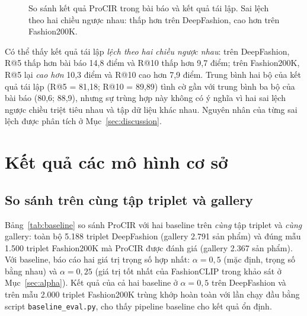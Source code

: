 \begin{figure}[h]
\centering
{}
\caption{So sánh kết quả ProCIR trong bài báo và kết quả tái lập. Sai lệch theo hai chiều ngược nhau: thấp hơn trên DeepFashion, cao hơn trên Fashion200K.}
\label{fig:repro-bar}
\end{figure}

Có thể thấy kết quả tái lập \emph{lệch theo hai chiều ngược nhau}: trên DeepFashion, R@5 thấp hơn bài báo 14,8 điểm và R@10 thấp hơn 9,7 điểm; trên Fashion200K, R@5 lại \emph{cao hơn} 10,3 điểm và R@10 cao hơn 7,9 điểm. Trung bình hai bộ của kết quả tái lập (R@5 = 81,18; R@10 = 89,89) tình cờ gần với trung bình ba bộ của bài báo (80,6; 88,9), nhưng sự trùng hợp này không có ý nghĩa vì hai sai lệch ngược chiều triệt tiêu nhau và tập dữ liệu khác nhau. Nguyên nhân của từng sai lệch được phân tích ở Mục~\ref{sec:discussion}.

\section{Kết quả các mô hình cơ sở}\label{sec:baseline-results}

\subsection{So sánh trên cùng tập triplet và gallery}

Bảng~\ref{tab:baseline} so sánh ProCIR với hai baseline trên \emph{cùng} tập triplet và \emph{cùng} gallery: toàn bộ 5.188 triplet DeepFashion (gallery 2.791 sản phẩm) và đúng mẫu 1.500 triplet Fashion200K mà ProCIR được đánh giá (gallery 2.367 sản phẩm). Với baseline, báo cáo hai giá trị trọng số hợp nhất: $\alpha = 0{,}5$ (mặc định, trọng số bằng nhau) và $\alpha = 0{,}25$ (giá trị tốt nhất của FashionCLIP trong khảo sát ở Mục~\ref{sec:alpha}). Kết quả của cả hai baseline ở $\alpha = 0{,}5$ trên DeepFashion và trên mẫu 2.000 triplet Fashion200K trùng khớp hoàn toàn với lần chạy đầu bằng script \texttt{baseline\_eval.py}, cho thấy pipeline baseline cho kết quả ổn định.

